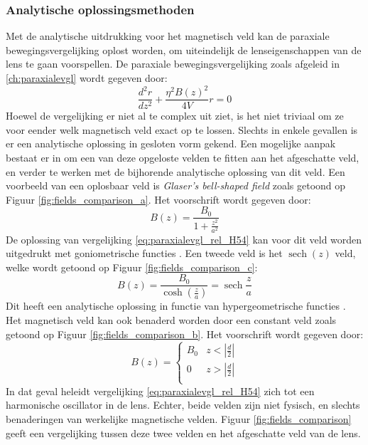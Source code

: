 \documentclass[we,twoside,openright,a4paper,11pt]{uantwerpenbamathesis}
\begin{document}
\subsubsection{Analytische oplossingsmethoden}
Met de analytische uitdrukking voor het magnetisch veld kan de paraxiale bewegingsvergelijking oplost worden, om uiteindelijk de lenseigenschappen van de lens te gaan voorspellen. De paraxiale bewegingsvergelijking zoals afgeleid in \ref{ch:paraxialevgl} wordt gegeven door:
\begin{equation}\label{eq:paraxialevgl_rel_H54}
    \frac{d^2r}{dz^2}+\frac{\eta^2B(z)^2}{4V}r=0
\end{equation}
Hoewel de vergelijking er niet al te complex uit ziet, is het niet triviaal om ze voor eender welk magnetisch veld exact op te lossen. Slechts in enkele gevallen is er een analytische oplossing in gesloten vorm gekend. Een mogelijke aanpak bestaat er in om een van deze opgeloste velden te fitten aan het afgeschatte veld, en verder te werken met de bijhorende analytische oplossing van dit veld. Een voorbeeld van een oplosbaar veld is \textit{Glaser's bell-shaped field} zoals getoond op Figuur \ref{fig:fields_comparison_a}. Het voorschrift wordt gegeven door:
\begin{equation}\label{eq:Glasers_field}
    B(z) = \frac{B_0}{1+\frac{z^2}{a^2}}
\end{equation}
De oplossing van vergelijking \ref{eq:paraxialevgl_rel_H54} kan voor dit veld worden uitgedrukt met goniometrische functies \cite{PWHawkes}. Een tweede veld is het $\operatorname*{sech}(z)$ veld, welke wordt getoond op Figuur \ref{fig:fields_comparison_c}:
\begin{equation}\label{eq:sech_field}
    B(z) = \frac{B_0}{\cosh\left(\frac{z}{a}\right)} = \operatorname*{sech}\frac{z}{a}
\end{equation}
Dit heeft een analytische oplossing in functie van hypergeometrische functies \cite{el_kareh_1970}. Het magnetisch veld kan ook benaderd worden door een constant veld zoals getoond op Figuur \ref{fig:fields_comparison_b}. Het voorschrift wordt gegeven door:
\begin{equation}\label{eq:constant_field}
    B(z) = 
    \begin{cases}
        B_0 & z<\left|\frac{d}{2}\right|\\
        0 & z>\left|\frac{d}{2}\right|\\
    \end{cases}
\end{equation}
In dat geval heleidt vergelijking \ref{eq:paraxialevgl_rel_H54} zich tot een harmonische oscillator in de lens. Echter, beide velden zijn niet fysisch, en slechts benaderingen van werkelijke magnetische velden. Figuur \ref{fig:fields_comparison} geeft een vergelijking tussen deze twee velden en het afgeschatte veld van de lens.
\end{document}
